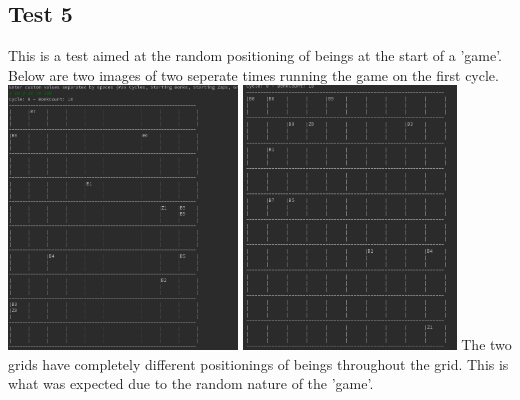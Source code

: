 \documentclass[12pt]{article}
\begin{document}
\subsection{Test 5}
This is a test aimed at the random positioning of beings at the start of a 'game'. Below are two images of two seperate times running the game on the first cycle.\\
\includegraphics[height=7cm]{test5a}
\includegraphics[height=7cm]{test5b}
 The two grids have completely different positionings of beings throughout the grid. This is what was expected due to the random nature of the 'game'.
\end{document}
